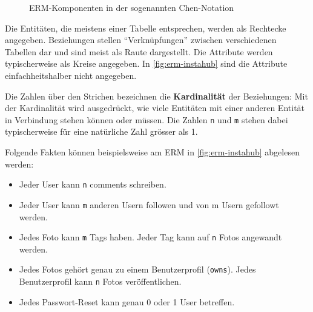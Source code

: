 \begin{figure}[H]
\centering
{}
\caption{\gls{ERM}-Komponenten in der sogenannten Chen-Notation}
\label{fig:erm-components}
\end{figure}

Die Entitäten, die meistens einer Tabelle entsprechen, werden als Rechtecke angegeben. Beziehungen stellen ``Verknüpfungen'' zwischen verschiedenen Tabellen dar und sind meist als Raute dargestellt. Die Attribute werden typischerweise als Kreise angegeben. In \cref{fig:erm-instahub} sind die Attribute einfachheitshalber nicht angegeben.

Die Zahlen über den Strichen bezeichnen die \textbf{Kardinalität} der Beziehungen: Mit der Kardinalität wird ausgedrückt, wie viele Entitäten mit einer anderen Entität in Verbindung stehen können oder müssen. Die Zahlen \texttt{n} und \texttt{m} stehen dabei typischerweise für eine natürliche Zahl grösser als 1. 

Folgende Fakten können beispielsweise am \gls{ERM} in \cref{fig:erm-instahub} abgelesen werden:
\begin{itemize}
\item Jeder User kann \texttt{n} comments schreiben.
\item Jeder User kann \texttt{m} anderen Usern followen und von m Usern gefollowt werden.
\item Jedes Foto kann \texttt{m} Tags haben. Jeder Tag kann auf \texttt{n} Fotos angewandt werden.
\item Jedes Fotos gehört genau zu einem Benutzerprofil (\texttt{owns}). Jedes Benutzerprofil kann \texttt{n} Fotos veröffentlichen.
\item Jedes Passwort-Reset kann genau 0 oder 1 User betreffen. 
\end{itemize}

